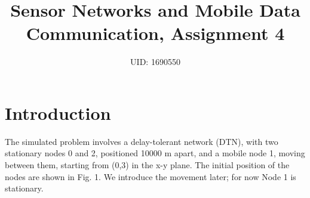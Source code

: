 \documentclass[11pt,journal]{article}
\begin{document}
	\title{Sensor Networks and Mobile Data Communication, Assignment 4}
	
	\author{UID: 1690550}%
	



	
	
	\maketitle
	
	
	
	
	\section{Introduction}
	The simulated problem involves a delay-tolerant network (DTN), with two stationary nodes 0 and 2, positioned 10000 m apart, and a mobile node 1, moving between them, starting from (0,3) in the x-y plane. The initial position of the nodes are shown in Fig. 1. We introduce the movement later; for now Node 1 is stationary.
	
\end{document}

